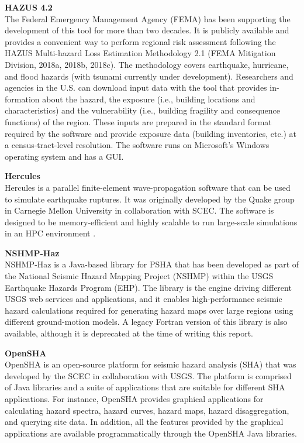 \noindent\textbf{HAZUS 4.2} \\The Federal Emergency Management Agency (FEMA) has been supporting the development of this tool for more than two decades. It is publicly available and provides a convenient way to perform regional risk assessment following the HAZUS Multi-hazard Loss Estimation Methodology 2.1 (FEMA Mitigation Division, 2018a, 2018b, 2018c). The methodology covers earthquake, hurricane, and flood hazards (with tsunami currently under development). Researchers and agencies in the U.S. can download input data with the tool that provides in-formation about the hazard, the exposure (i.e., building locations and characteristics) and the vulnerability (i.e., building fragility and consequence functions) of the region. These inputs are prepared in the standard format required by the software and provide exposure data (building inventories, etc.) at a census-tract-level resolution. The software runs on Microsoft’s Windows operating system and has a GUI.
\newline

\noindent\textbf{Hercules} \\Hercules \citep{tu2006mesh} is a parallel finite-element wave-propagation software that can be used to simulate earthquake ruptures. It was originally developed by the Quake group in Carnegie Mellon University in collaboration with SCEC. The software is designed to be memory-efficient and highly scalable to run large-scale simulations in an HPC environment \citep{taborda2010speeding}. 
\newline

\noindent\textbf{NSHMP-Haz} \\NSHMP-Haz is a Java-based library for PSHA that has been developed as part of the National Seismic Hazard Mapping Project (NSHMP) within the USGS Earthquake Hazards Program (EHP). The library is the engine driving different USGS web services and applications, and it enables high-performance seismic hazard calculations required for generating hazard maps over large regions using different ground-motion models. A legacy Fortran version of this library is also available, although it is deprecated at the time of writing this report.
\newline

\noindent\textbf{OpenSHA} \\OpenSHA \citep{field2003opensha} is an open-source platform for seismic hazard analysis (SHA) that was developed by the SCEC in collaboration with USGS. The platform is comprised of Java libraries and a suite of applications that are suitable for different SHA applications. For instance, OpenSHA provides graphical applications for calculating hazard spectra, hazard curves, hazard maps, hazard disaggregation, and querying site data. In addition, all the features provided by the graphical applications are available programmatically through the OpenSHA Java libraries.
\newline

